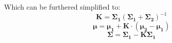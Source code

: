 \documentclass{article}
\begin{document}
Which can be furthered simplified to:
\begin{equation}
    \bm{K} = \bm{\Sigma_1}(\bm{\Sigma_1} + \bm{\Sigma_2})^{-1}
\end{equation}
\begin{equation}
    \bm{\mu} = \bm{\mu_1} + \bm{K} \cdot (\bm{\mu_2} - \bm{\mu_1})
\end{equation}
\begin{equation}
    \bm{\Sigma} = \bm{\Sigma_1} -\bm{K}\bm{\Sigma_1}
\end{equation}
\end{document}
